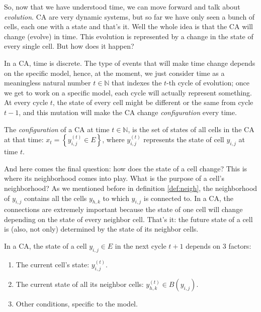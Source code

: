 So, now that we have understood time, we can move forward and talk about \textit{evolution}.
CA are very dynamic systems, but so far we have only seen a bunch of cells, each one with a state and
that's it. Well the whole idea is that the CA will change (evolve) in time. This evolution is
represented by a change in the state of every single cell. But how does it happen?

In a CA, time is discrete. The type of events that will make time change depends on the specific model,
hence, at the moment, we just consider time as a meaningless natural number $t \in \mathbb{N}$
that indexes the $t$-th cycle of evolution; once we get to work on a specific model, each cycle will
actually represent something.
At every cycle $t$,
the state of every cell might be different or the same from cycle $t-1$, and this mutation will make
the CA change \textit{configuration} every time.

\begin{definition}[CA configuration]
The \textit{configuration} of a CA at time $t \in \mathbb{N}$, is the set of states of all cells
in the CA at that time: $x_t = \left\{ y^{(t)}_{i,j} \in E \right\}$, where
$y^{(t)}_{i,j}$ represents the state of cell $y_{i,j}$ at time $t$.
\end{definition}

And here comes the final question: how does the state of a cell change? This is where its
neighborhood comes into play.
What is the purpose of a cell's neighborhood? As we mentioned before in definition \ref{def:neigh},
the neighborhood of $y_{i,j}$ contains all the cells $y_{h,k}$ to which $y_{i,j}$ is connected to.
In a CA, the connections are extremely important because the state of one cell will change depending
on the state of every neighbor cell. That's it: the future state of a cell is (also, not only)
determined by the state of its neighbor cells.

\begin{proposition}
\label{prop:statechange}
In a CA, the state of a cell $y_{i,j} \in E$ in the next cycle $t+1$ depends on 3 factors:
\begin{enumerate}
\item The current cell's state: $y^{(t)}_{i,j}$.
\item The current state of all its neighbor cells: $y^{(t)}_{h,k} \in B\left( y_{i,j} \right)$.
\item Other conditions, specific to the model.
\end{enumerate}
\end{proposition}

